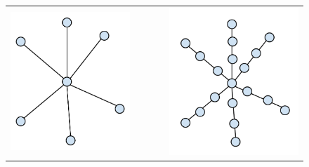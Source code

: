 \documentclass[MS,synopsis]{iitmdiss}
\begin{document}
\begin{figure}[t]
  \centering
  \begin{tabular}[h]{ccccc}
  \includegraphics[scale=0.3]{../img/star.pdf} &&&&
  \includegraphics[scale=0.3]{../img/kstar.pdf}\\

\end{tabular}
\end{figure}
\end{document}
